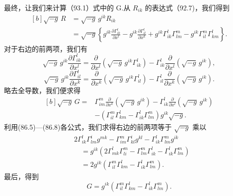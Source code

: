 最终，让我们来计算（93.1）式中的 G.从 $R_{ik}$ 的表达式（92.7)，我们得到
\begin{equation*}
\begin{aligned}[b]
  \sqrt{-g}\,R&=\sqrt{-g}\,g^{ik}R_{ik}\\
  &=\sqrt{-g}\left\{g^{ik}\frac{\partial\Gamma^l_{ik}}{\partial x^l}
  -g^{ik}\frac{\partial\Gamma^l_{il}}{\partial x^k}
  +g^{ik}\Gamma^l_{ik}\Gamma^m_{lm}
  -g^{ik}\Gamma^m_{il}\Gamma^l_{km}\right\}.
\end{aligned}
\end{equation*}
对于右边的前两项，我们有
\begin{equation*}
  \sqrt{-g}\,g^{ik}\frac{\partial\Gamma^l_{ik}}{\partial x^l}
  =\frac{\partial}{\partial x^l}\left(\sqrt{-g}\,g^{ik}\Gamma^l_{ik}\right)
  -\Gamma^l_{ik}\frac{\partial}{\partial x^l}\left(\sqrt{-g}\,g^{ik}\right),
\end{equation*}
\begin{equation*}
  \sqrt{-g}\,g^{ik}\frac{\partial\Gamma^l_{il}}{\partial x^k}
  =\frac{\partial}{\partial x^k}\left(\sqrt{-g}\,g^{ik}\Gamma^l_{il}\right)
  -\Gamma^l_{il}\frac{\partial}{\partial x^k}\left(\sqrt{-g}\,g^{ik}\right).
\end{equation*}
略去全导数，我们便求得
\begin{equation*}
\begin{aligned}[b]
  \sqrt{-g}\,G={}&\Gamma^m_{im}
  \frac{\partial}{\partial x^k}\left(\sqrt{-g}\,g^{ik}\right)
  -\Gamma^l_{ik}\frac{\partial}{\partial x^l}
  \left(\sqrt{-g}\,g^{ik}\right)\\
  &-\left(\Gamma^m_{il}\Gamma^l_{km}
  -\Gamma^l_{ik}\Gamma^m_{lm}\right)g^{ik}\sqrt{-g}.
\end{aligned}
\end{equation*}
利用(86.5)—(86.8)各公式，我们求得右边的前两项等于 $\sqrt{-g}$ 乘以
\begin{equation*}
\begin{aligned}
  &2\Gamma^l_{ik}\Gamma^i_{lm}g^{mk}
  -\Gamma^m_{im}\Gamma^i_{kl}g^{kl}
  -\Gamma^l_{ik}\Gamma^m_{lm}g^{ik}\\
  &\quad=g^{ik}\left(2\Gamma^l_{mk}\Gamma^m_{li}
  -\Gamma^m_{lm}\Gamma^l_{ik}
  -\Gamma^l_{ik}\Gamma^m_{lm}\right)\\
  &\quad=2g^{ik}\left(\Gamma^m_{il}\Gamma^l_{km}
  -\Gamma^l_{ik}\Gamma^m_{lm}\right).
\end{aligned}
\end{equation*}
最后，得到
\begin{equation}
  G=g^{ik}\left(\Gamma^m_{il}\Gamma^l_{km}
  -\Gamma^l_{ik}\Gamma^m_{lm}\right).
\end{equation}

